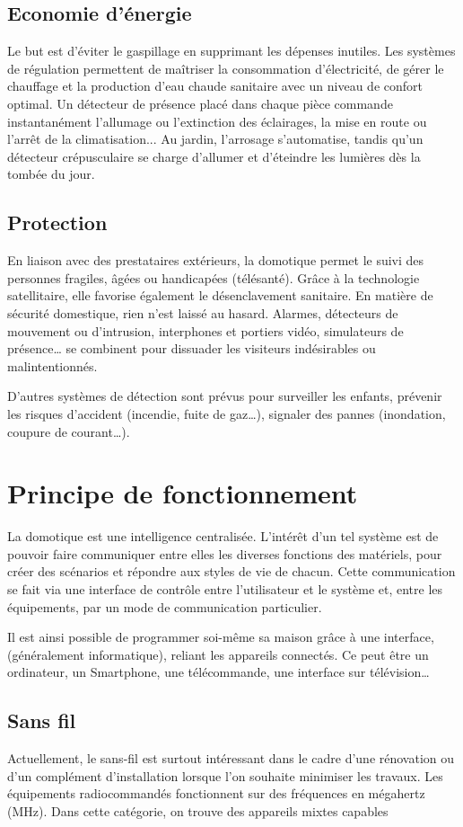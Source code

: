 \documentclass[12pt]{article}
\begin{document}
\subsection{Economie d'énergie}
Le but est d’éviter le gaspillage en supprimant les dépenses inutiles. Les systèmes de régulation permettent de maîtriser la consommation d’électricité, de gérer le chauffage et la production d’eau chaude sanitaire avec un niveau de confort optimal. Un détecteur de présence placé dans chaque pièce commande instantanément l’allumage ou l’extinction des éclairages, la mise en route ou l’arrêt de la climatisation... Au jardin, l’arrosage s’automatise, tandis qu’un détecteur crépusculaire se charge d’allumer et d’éteindre les lumières dès la tombée du jour.

\subsection{Protection}
En liaison avec des prestataires extérieurs, la domotique permet le suivi des personnes fragiles, âgées ou handicapées (télésanté). Grâce à la technologie satellitaire, elle favorise également le désenclavement sanitaire. En matière de sécurité domestique, rien n’est laissé au hasard. Alarmes, détecteurs de mouvement ou d’intrusion, interphones et portiers vidéo, simulateurs de présence… se combinent pour dissuader les visiteurs indésirables ou malintentionnés.

D’autres systèmes de détection sont prévus pour surveiller les enfants, prévenir les risques d’accident (incendie, fuite de gaz…), signaler des pannes (inondation, coupure de courant…).

\section{Principe de fonctionnement}
La domotique est une intelligence centralisée. L'intérêt d'un tel système est de pouvoir faire communiquer entre elles les diverses fonctions des matériels, pour créer des scénarios et répondre aux styles de vie de chacun. Cette communication se fait via une interface de contrôle entre l'utilisateur et le système et, entre les équipements, par un mode de communication particulier.

Il est ainsi possible de programmer soi-même sa maison grâce à une interface, (généralement informatique), reliant les appareils connectés. Ce peut être un ordinateur, un Smartphone, une télécommande, une interface sur télévision…
\subsection{Sans fil}
Actuellement, le sans-fil est surtout intéressant dans le cadre d’une rénovation ou d’un complément d’installation lorsque l’on souhaite minimiser les travaux. Les équipements radiocommandés fonctionnent sur des fréquences en mégahertz (MHz). Dans cette catégorie, on trouve des appareils mixtes capables
\end{document}
